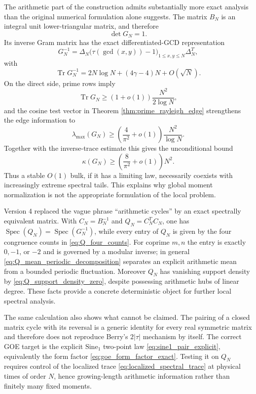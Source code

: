 \documentclass[11pt]{amsart}
\numberwithin{equation}{section}
\theoremstyle{plain}
\theoremstyle{definition}
\theoremstyle{remark}
\newcommand{\Tr}{\operatorname{Tr}}
\newcommand{\Spec}{\operatorname{Spec}}
\begin{document}
The arithmetic part of the construction admits substantially more exact analysis than the original numerical formulation alone suggests.  The matrix $B_N$ is an integral unit lower-triangular matrix, and therefore
\begin{equation}
\det G_N=1.
\end{equation}
Its inverse Gram matrix has the exact differentiated-GCD representation
\begin{equation}
G_N^{-1}=\Delta_N
\bigl(\tau(\gcd(x,y))-1\bigr)_{1\le x,y\le N}
\Delta_N^T,
\end{equation}
with
\begin{equation}
\Tr G_N^{-1}
=2N\log N+(4\gamma-4)N+O(\sqrt N).
\end{equation}
On the direct side, prime rows imply
\begin{equation}
\Tr G_N\ge(1+o(1))\frac{N^2}{2\log N},
\end{equation}
and the cosine test vector in Theorem \ref{thm:prime_rayleigh_edge} strengthens the edge information to
\begin{equation}
\lambda_{\max}(G_N)
\ge\left(\frac4{\pi^2}+o(1)\right)\frac{N^2}{\log N}.
\end{equation}
Together with the inverse-trace estimate this gives the unconditional bound
\begin{equation}
\kappa(G_N)
\ge\left(\frac8{\pi^2}+o(1)\right)N^2.
\end{equation}
Thus a stable $O(1)$ bulk, if it has a limiting law, necessarily coexists with increasingly extreme spectral tails.  This explains why global moment normalization is not the appropriate formulation of the local problem.

Version 4 replaced the vague phrase ``arithmetic cycles'' by an exact spectrally equivalent matrix.  With $C_N=B_N^{-1}$ and $Q_N=C_N^TC_N$, one has $\Spec(Q_N)=\Spec(G_N^{-1})$, while every entry of $Q_N$ is given by the four congruence counts in \eqref{eq:Q_four_counts}.  For coprime $m,n$ the entry is exactly $0,-1$, or $-2$ and is governed by a modular inverse; in general \eqref{eq:Q_mean_periodic_decomposition} separates an explicit arithmetic mean from a bounded periodic fluctuation.  Moreover $Q_N$ has vanishing support density by \eqref{eq:Q_support_density_zero}, despite possessing arithmetic hubs of linear degree.  These facts provide a concrete deterministic object for further local spectral analysis.

The same calculation also shows what cannot be claimed.  The pairing of a closed matrix cycle with its reversal is a generic identity for every real symmetric matrix and therefore does not reproduce Berry's $2|\tau|$ mechanism by itself.  The correct GOE target is the explicit $\mathrm{Sine}_1$ two-point law \eqref{eq:sine1_pair_explicit}, equivalently the form factor \eqref{eq:goe_form_factor_exact}.  Testing it on $Q_N$ requires control of the localized trace \eqref{eq:localized_spectral_trace} at physical times of order $N$, hence growing-length arithmetic information rather than finitely many fixed moments.
\end{document}
